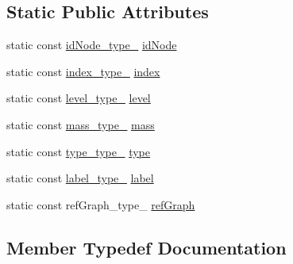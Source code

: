 \subsection*{Static Public Attributes}
\begin{DoxyCompactItemize}
\item 
static const \hyperlink{structodb_1_1query__columns_3_01_1_1_node_00_01id__pgsql_00_01_a_01_4_a46023ceac6e1a9642073db0b3a123053}{id\+Node\+\_\+type\+\_\+} \hyperlink{structodb_1_1query__columns_3_01_1_1_node_00_01id__pgsql_00_01_a_01_4_afdf769386fa06ecedf55e1c76ffa93c1}{id\+Node}
\item 
static const \hyperlink{structodb_1_1query__columns_3_01_1_1_node_00_01id__pgsql_00_01_a_01_4_a64592e84000ac1b60ab1a62f80fa55db}{index\+\_\+type\+\_\+} \hyperlink{structodb_1_1query__columns_3_01_1_1_node_00_01id__pgsql_00_01_a_01_4_aee6cf432bfe53eddfa3fc6a7ed36b012}{index}
\item 
static const \hyperlink{structodb_1_1query__columns_3_01_1_1_node_00_01id__pgsql_00_01_a_01_4_a23b6e7e1613f6c49d22ed865945c6325}{level\+\_\+type\+\_\+} \hyperlink{structodb_1_1query__columns_3_01_1_1_node_00_01id__pgsql_00_01_a_01_4_a1d30f30469efdda48ac48861007d714b}{level}
\item 
static const \hyperlink{structodb_1_1query__columns_3_01_1_1_node_00_01id__pgsql_00_01_a_01_4_aa2d823f900ade5bc0cd5bb6847e7e72c}{mass\+\_\+type\+\_\+} \hyperlink{structodb_1_1query__columns_3_01_1_1_node_00_01id__pgsql_00_01_a_01_4_a8d55039821cceddb4a2cd12f3b896915}{mass}
\item 
static const \hyperlink{structodb_1_1query__columns_3_01_1_1_node_00_01id__pgsql_00_01_a_01_4_a60d79748387e6b960bfc9af6d5c367f6}{type\+\_\+type\+\_\+} \hyperlink{structodb_1_1query__columns_3_01_1_1_node_00_01id__pgsql_00_01_a_01_4_a42e9413de6ee8d1dab25c319c9dadb49}{type}
\item 
static const \hyperlink{structodb_1_1query__columns_3_01_1_1_node_00_01id__pgsql_00_01_a_01_4_a9bb2b1fcd94c969f5d18da731e83e972}{label\+\_\+type\+\_\+} \hyperlink{structodb_1_1query__columns_3_01_1_1_node_00_01id__pgsql_00_01_a_01_4_a3975c3b67f64d91f764bbc285a47aa80}{label}
\item 
static const ref\+Graph\+\_\+type\+\_\+ \hyperlink{structodb_1_1query__columns_3_01_1_1_node_00_01id__pgsql_00_01_a_01_4_a6a2bbc7cc9adb0c0285cb31932708b37}{ref\+Graph}
\end{DoxyCompactItemize}


\subsection{Member Typedef Documentation}
\hypertarget{structodb_1_1query__columns_3_01_1_1_node_00_01id__pgsql_00_01_a_01_4_a46023ceac6e1a9642073db0b3a123053}{}
